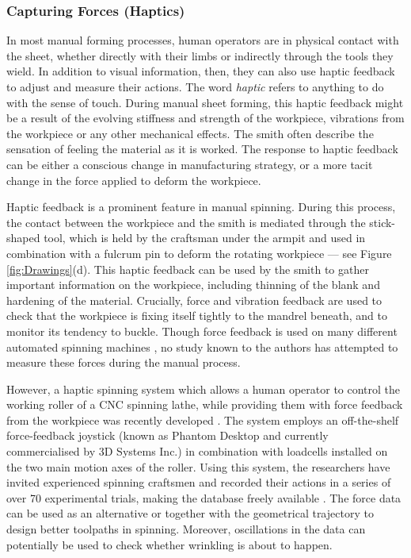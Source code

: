 \subsubsection{Capturing Forces (Haptics)}
In most manual forming processes, human operators are in physical contact with the sheet, whether directly with their limbs or indirectly through the tools they wield. In addition to visual information, then, they can also use haptic feedback to adjust and measure their actions. The word \textit{haptic} refers to anything to do with the sense of touch. During manual sheet forming, this haptic feedback might be a result of the evolving stiffness and strength of the workpiece, vibrations from the workpiece or any other mechanical effects. The smith often describe the sensation of feeling the material as it is worked. The response to haptic feedback can be either a conscious change in manufacturing strategy, or a more tacit change in the force applied to deform the workpiece. 

Haptic feedback is a prominent feature in manual spinning. During this process, the contact between the workpiece and the smith is mediated through the stick-shaped tool, which is held by the craftsman under the armpit and used in combination with a fulcrum pin to deform the rotating workpiece --- see Figure \ref{fig:Drawings}(d). This haptic feedback can be used by the smith to gather important information on the workpiece, including thinning of the blank and hardening of the material. Crucially, force and vibration feedback are used to check that the workpiece is fixing itself tightly to the mandrel beneath, and to monitor its tendency to buckle. Though force feedback is used on many different automated spinning machines \citep{Arai2006Force-controlledMotors}, no study known to the authors has attempted to measure these forces during the manual process. 

However, a haptic spinning system which allows a human operator to control the working roller of a CNC spinning lathe, while providing them with force feedback from the workpiece was recently developed \citep{Russo2019HapticSpinning}. The system employs an off-the-shelf force-feedback joystick (known as Phantom Desktop and currently commercialised by 3D Systems Inc.) in combination with loadcells installed on the two main motion axes of the roller. Using this system, the researchers have invited experienced spinning craftsmen and recorded their actions in a series of over 70 experimental trials, making the database freely available \citep{Russo2020ResearchSpinning}. The force data can be used as an alternative or together with the geometrical trajectory to design better toolpaths in spinning. Moreover, oscillations in the data can potentially be used to check whether wrinkling is about to happen. 

